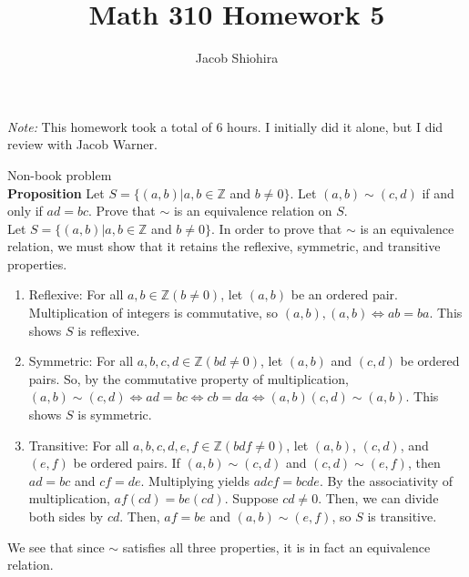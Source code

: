 \documentclass[12pt]{article}
\newcommand{\Z}{\mathbb{Z}}
\newenvironment{problem}[2][Problem]{\begin{trivlist}
\item[\hskip \labelsep {\bfseries #1}\hskip \labelsep {\bfseries #2.}]}{\end{trivlist}}
\begin{document}
 
\title{Math 310 Homework 5}
\author{Jacob Shiohira}
\maketitle

\noindent
\textit{Note:} This homework took a total of 6 hours. I initially did it alone, but I did review with Jacob Warner.

\begin{problem}{1} Non-book problem \\

\noindent
\textbf{Proposition} Let $S=\{(a,b) | a,b \in \Z$ and $b \neq 0\}$. Let $(a,b) \sim (c,d)$ if and only if $ad=bc$. Prove that $ \sim $ is an equivalence relation on $S$. \\

\noindent
Let $S=\{(a,b) | a,b \in \Z$ and $b \neq 0\}$. In order to prove that $ \sim $ is an equivalence relation, we must show that it retains the reflexive, symmetric, and transitive properties.
\begin{enumerate}
\item Reflexive: For all $a,b \in \Z (b \neq 0)$, let $(a,b)$ be an ordered pair. Multiplication of integers is commutative, so $(a,b), (a,b) \Longleftrightarrow ab=ba$. This shows $S$ is reflexive.
\item Symmetric: For all $a,b,c,d \in \Z (bd \neq 0)$, let $(a,b)$ and $(c,d)$ be ordered pairs. So, by the commutative property of multiplication, $(a,b) \sim (c,d) \Longleftrightarrow ad=bc \Longleftrightarrow cb=da \Longleftrightarrow (a,b)  (c,d) \sim (a,b)$. This shows $S$ is symmetric. 
\item Transitive: For all $a,b,c,d, e, f \in \Z (bdf \neq 0)$, let $(a,b)$, $(c,d)$, and $(e,f)$ be ordered pairs. If $(a,b) \sim (c,d)$ and $(c,d) \sim (e,f)$, then $ad=bc$ and $cf=de$. Multiplying yields $adcf=bcde$. By the associativity of multiplication, $af(cd)=be(cd)$. Suppose $cd \neq 0$. Then, we can divide both sides by $cd$. Then, $af=be$ and $(a,b) \sim (e,f)$, so $S$ is transitive.
\end{enumerate}

\noindent
We see that since $\sim$ satisfies all three properties, it is in fact an equivalence relation. \qedsymbol


\end{problem}
\end{document}
